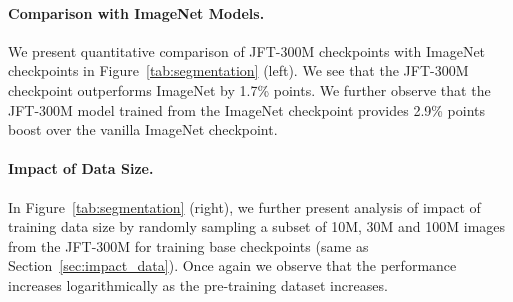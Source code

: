 \documentclass[10pt,twocolumn,letterpaper]{article}
\begin{document}
\paragraph{Comparison with ImageNet Models.} We present quantitative comparison of JFT-300M checkpoints with ImageNet checkpoints in Figure~\ref{tab:segmentation} (left). We see that the JFT-300M checkpoint outperforms ImageNet by 1.7\% points. We further observe that the JFT-300M model trained from the ImageNet checkpoint provides 2.9\% points boost over the vanilla ImageNet checkpoint.

\paragraph{Impact of Data Size.} In Figure~\ref{tab:segmentation} (right), we further present analysis of impact of training data size by randomly sampling a subset of 10M, 30M and 100M images from the JFT-300M for training base checkpoints (same as Section~\ref{sec:impact_data}). Once again we observe that the performance increases logarithmically as the pre-training dataset increases.
\end{document}
